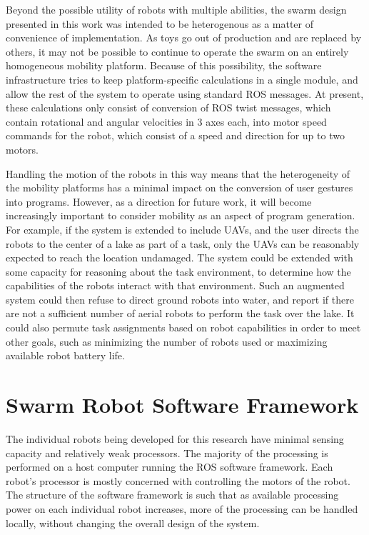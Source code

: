 Beyond the possible utility of robots with multiple abilities, the swarm design presented in this work was intended to be heterogenous as a matter of convenience of implementation. 
As toys go out of production and are replaced by others, it may not be possible to continue to operate the swarm on an entirely homogeneous mobility platform. 
Because of this possibility, the software infrastructure tries to keep platform-specific calculations in a single module, and allow the rest of the system to operate using standard ROS messages. 
At present, these calculations only consist of conversion of ROS twist messages, which contain rotational and angular velocities in 3 axes each, into motor speed commands for the robot, which consist of a speed and direction for up to two motors. 

Handling the motion of the robots in this way means that the heterogeneity of the mobility platforms has a minimal impact on the conversion of user gestures into programs. 
However, as a direction for future work, it will become increasingly important to consider mobility as an aspect of program generation. 
For example, if the system is extended to include UAVs, and the user directs the robots to the center of a lake as part of a task, only the UAVs can be reasonably expected to reach the location undamaged. 
The system could be extended with some capacity for reasoning about the task environment, to determine how the capabilities of the robots interact with that environment. 
Such an augmented system could then refuse to direct ground robots into water, and report if there are not a sufficient number of aerial robots to perform the task over the lake. 
It could also permute task assignments based on robot capabilities in order to meet other goals, such as minimizing the number of robots used or maximizing available robot battery life. 

\section{Swarm Robot Software Framework} \label{section:Swarm_Robot_Software_Framework}

The individual robots being developed for this research have minimal sensing capacity and relatively weak processors. 
The majority of the processing is performed on a host computer running the ROS software framework. 
Each robot's processor is mostly concerned with controlling the motors of the robot. 
The structure of the software framework is such that as available processing power on each individual robot increases, more of the processing can be handled locally, without changing the overall design of the system.

